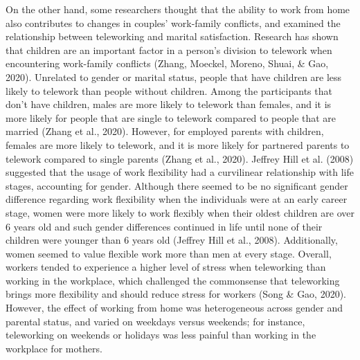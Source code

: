 \documentclass[
  english,
  man]{apa6}
\begin{document}
On the other hand, some researchers thought that the ability to work from home also contributes to changes in couples' work-family conflicts, and examined the relationship between teleworking and marital satisfaction. Research has shown that children are an important factor in a person's division to telework when encountering work-family conflicts (Zhang, Moeckel, Moreno, Shuai, \& Gao, 2020). Unrelated to gender or marital status, people that have children are less likely to telework than people without children. Among the participants that don't have children, males are more likely to telework than females, and it is more likely for people that are single to telework compared to people that are married (Zhang et al., 2020). However, for employed parents with children, females are more likely to telework, and it is more likely for partnered parents to telework compared to single parents (Zhang et al., 2020). Jeffrey Hill et al. (2008) suggested that the usage of work flexibility had a curvilinear relationship with life stages, accounting for gender. Although there seemed to be no significant gender difference regarding work flexibility when the individuals were at an early career stage, women were more likely to work flexibly when their oldest children are over 6 years old and such gender differences continued in life until none of their children were younger than 6 years old (Jeffrey Hill et al., 2008). Additionally, women seemed to value flexible work more than men at every stage. Overall, workers tended to experience a higher level of stress when teleworking than working in the workplace, which challenged the commonsense that teleworking brings more flexibility and should reduce stress for workers (Song \& Gao, 2020). However, the effect of working from home was heterogeneous across gender and parental status, and varied on weekdays versus weekends; for instance, teleworking on weekends or holidays was less painful than working in the workplace for mothers.
\end{document}
